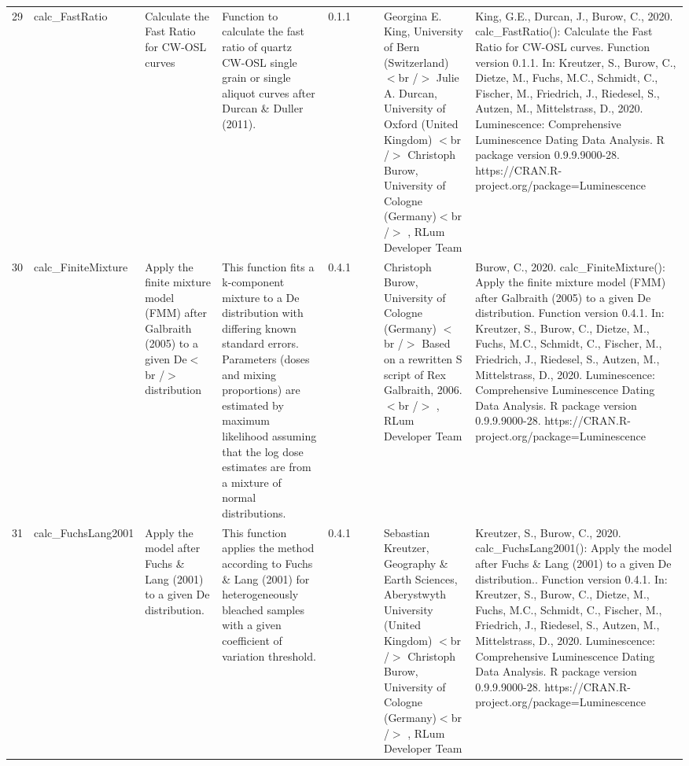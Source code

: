\begin{table}[ht]
\begin{tabular}{rllllllll}
 \\ 
  29 & calc\_FastRatio & Calculate the Fast Ratio for CW-OSL curves & Function to calculate the fast ratio of quartz CW-OSL single grain or single aliquot curves after Durcan \& Duller (2011). & 0.1.1
 &  &  & Georgina E. King, University of Bern (Switzerland)  $<$br /$>$ Julie A. Durcan, University of Oxford (United Kingdom)  $<$br /$>$ Christoph Burow, University of Cologne (Germany)$<$br /$>$ , RLum Developer Team & King, G.E., Durcan, J., Burow, C., 2020. calc\_FastRatio(): Calculate the Fast Ratio for CW-OSL curves. Function version 0.1.1. In: Kreutzer, S., Burow, C., Dietze, M., Fuchs, M.C., Schmidt, C., Fischer, M., Friedrich, J., Riedesel, S., Autzen, M., Mittelstrass, D., 2020. Luminescence: Comprehensive Luminescence Dating Data Analysis. R package version 0.9.9.9000-28. https://CRAN.R-project.org/package=Luminescence
 \\ 
  30 & calc\_FiniteMixture & Apply the finite mixture model (FMM) after Galbraith (2005) to a given De$<$br /$>$ distribution & This function fits a k-component mixture to a De distribution with differing known standard errors. Parameters (doses and mixing proportions) are estimated by maximum likelihood assuming that the log dose estimates are from a mixture of normal distributions. & 0.4.1
 &  &  & Christoph Burow, University of Cologne (Germany)  $<$br /$>$ Based on a rewritten S script of Rex Galbraith, 2006.$<$br /$>$ , RLum Developer Team & Burow, C., 2020. calc\_FiniteMixture(): Apply the finite mixture model (FMM) after Galbraith (2005) to a given De distribution. Function version 0.4.1. In: Kreutzer, S., Burow, C., Dietze, M., Fuchs, M.C., Schmidt, C., Fischer, M., Friedrich, J., Riedesel, S., Autzen, M., Mittelstrass, D., 2020. Luminescence: Comprehensive Luminescence Dating Data Analysis. R package version 0.9.9.9000-28. https://CRAN.R-project.org/package=Luminescence
 \\ 
  31 & calc\_FuchsLang2001 & Apply the model after Fuchs \& Lang (2001) to a given De distribution. & This function applies the method according to Fuchs \& Lang (2001) for heterogeneously bleached samples with a given coefficient of variation threshold. & 0.4.1
 &  &  & Sebastian Kreutzer, Geography \& Earth Sciences, Aberystwyth University (United Kingdom)  $<$br /$>$ Christoph Burow, University of Cologne (Germany)$<$br /$>$ , RLum Developer Team & Kreutzer, S., Burow, C., 2020. calc\_FuchsLang2001(): Apply the model after Fuchs \& Lang (2001) to a given De distribution.. Function version 0.4.1. In: Kreutzer, S., Burow, C., Dietze, M., Fuchs, M.C., Schmidt, C., Fischer, M., Friedrich, J., Riedesel, S., Autzen, M., Mittelstrass, D., 2020. Luminescence: Comprehensive Luminescence Dating Data Analysis. R package version 0.9.9.9000-28. https://CRAN.R-project.org/package=Luminescence

\end{tabular}
\end{table}

